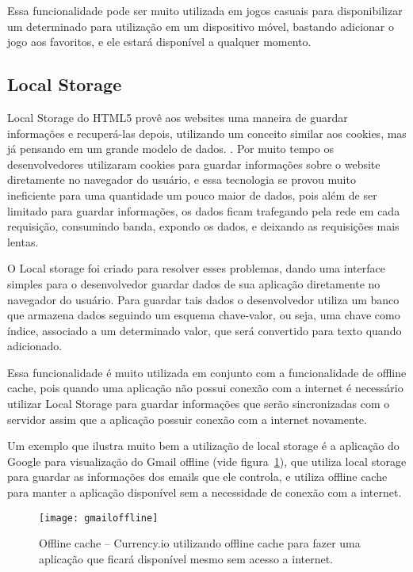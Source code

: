Essa funcionalidade pode ser muito utilizada em jogos casuais para disponibilizar um
determinado para utilização em um dispositivo móvel, bastando
adicionar o jogo aos favoritos, e ele estará disponível a qualquer
momento.


\subsection{Local Storage}

Local Storage do HTML5 provê aos websites uma maneira de guardar
informações e recuperá-las depois, utilizando um conceito similar aos
cookies, mas já pensando em um grande modelo de dados. \cite{pilgrim2010html5}.
Por muito tempo os desenvolvedores utilizaram cookies para guardar
informações sobre o website diretamente no navegador do usuário, e
essa tecnologia se provou muito ineficiente para uma quantidade um
pouco maior de dados, pois além de ser limitado para guardar informações,
os dados ficam trafegando pela rede em cada requisição, consumindo
banda, expondo os dados, e deixando as requisições mais lentas.

O Local storage foi criado para resolver esses problemas, dando uma
interface simples para o desenvolvedor guardar dados de sua
aplicação diretamente no navegador do usuário. Para guardar tais dados
o desenvolvedor utiliza um banco que armazena dados seguindo um
esquema chave-valor, ou seja, uma chave como índice, associado a um
determinado valor, que será convertido para texto quando adicionado.

Essa funcionalidade é muito utilizada em conjunto com a funcionalidade
de offline cache, pois quando uma aplicação não possui conexão com a
internet é necessário utilizar Local Storage para guardar informações
que serão sincronizadas com o servidor assim que a aplicação possuir
conexão com a internet novamente.

Um exemplo que ilustra muito bem a utilização de local storage é a
aplicação do Google para visualização do Gmail offline (vide
figura~\ref{img:gmailoffline}), que utiliza local storage para guardar
as informações dos emails que ele controla, e utiliza offline cache
para manter a aplicação disponível sem a necessidade de conexão com a
internet.

\begin{figure}[H]
  \centering
	\texttt{[image: gmailoffline]}
  \caption{Offline cache {--} Currency.io utilizando offline cache
  para fazer uma aplicação que ficará disponível mesmo sem acesso a
  internet.}
  \label{img:gmailoffline}
\end{figure}

